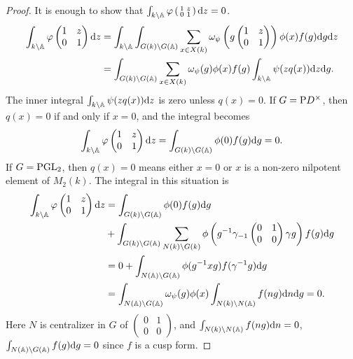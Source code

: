 \begin{proof}
It is enough to show that $\int_{k\backslash \mathbb{A}} \varphi\left(\begin{smallmatrix}
    1 & z \\ 0 & 1
\end{smallmatrix}\right)\mathrm{d} z = 0$.
\begin{align*}
\int_{k \backslash \mathbb{A}} \varphi \begin{pmatrix}
    1 & z \\ 0 & 1
\end{pmatrix} \mathrm{d} z &= \int_{k \backslash \mathbb{A}} \int_{G(k) \backslash G(\mathbb{A})}  \sum_{x \in X(k)} \omega_\psi\left(g \begin{pmatrix}
    1 & z \\ 0 & 1
\end{pmatrix}\right)\phi(x) f(g) \mathrm{d} g \mathrm{d} z \\
&= \int_{G(k) \backslash G(\mathbb{A})} \sum_{x \in X(k)} \omega_\psi(g) \phi(x) f(g) \int_{k \backslash \mathbb{A}} \psi(z q(x)) \mathrm{d} z \mathrm{d} g.
\end{align*}
The inner integral $\int_{k \backslash \mathbb{A}} \psi(z q(x)) \mathrm{d} z$ is zero unless $q(x) = 0$.
If $G = \mathrm{P} D^\times$, then $q(x) = 0$ if and only if $x = 0$, and the integral becomes
\[
\int_{k \backslash \mathbb{A}} \varphi \begin{pmatrix}
    1 & z \\ 0 & 1
\end{pmatrix} \mathrm{d} z = \int_{G(k) \backslash G(\mathbb{A})} \phi(0) f(g) \mathrm{d} g = 0.
\]
If $G = \mathrm{PGL}_2$, then $q(x)=0$ means either $x = 0$ or $x$ is a non-zero nilpotent element of $M_2(k)$. The integral in this situation is
\begin{align*}
    \int_{k \backslash \mathbb{A}} \varphi \begin{pmatrix}
        1 & z \\ 0 & 1
    \end{pmatrix} \mathrm{d} z &= \int_{G(k) \backslash G(\mathbb{A})} \phi(0) f(g) \mathrm{d} g \\
    &+ \int_{G(k) \backslash G(\mathbb{A})} \sum_{N(k) \backslash G(k)} \phi \left(g^{-1} \gamma_{-1} \begin{pmatrix}
        0 & 1 \\ 0 & 0
    \end{pmatrix} \gamma g\right) f(g) \mathrm{d} g \\
    &= 0 + \int_{N(\mathbb{A}) \backslash G(\mathbb{A})} \phi(g^{-1} xg) f(\gamma^{-1} g) \mathrm{d} g \\
    &= \int_{N(\mathbb{A}) \backslash G(\mathbb{A})} \omega_\psi(g) \phi(x) \int_{N(k) \backslash N(\mathbb{A})} f(ng) \mathrm{d} n \mathrm{d} g = 0.
\end{align*}
Here $N$ is centralizer in $G$ of $\left(\begin{smallmatrix}
    0 & 1 \\ 0& 0
\end{smallmatrix}\right)$, and $\int_{N(k) \backslash N(\mathbb{A})} f(ng) \mathrm{d} n = 0$, $\int_{N(\mathbb{A}) \backslash G(\mathbb{A})} f(g) \mathrm{d} g = 0$  since $f$ is a cusp form.
\end{proof}

